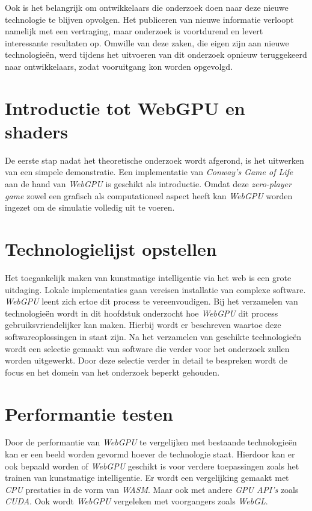 \bigbreak{}

Ook is het belangrijk om ontwikkelaars die onderzoek doen naar deze nieuwe technologie te blijven opvolgen. Het publiceren van nieuwe informatie verloopt namelijk met een vertraging, maar onderzoek is voortdurend en levert interessante resultaten op. Omwille van deze zaken, die eigen zijn aan nieuwe technologieën, werd tijdens het uitvoeren van dit onderzoek opnieuw teruggekeerd naar ontwikkelaars, zodat vooruitgang kon worden opgevolgd.

\section{Introductie tot WebGPU en shaders}

De eerste stap nadat het theoretische onderzoek wordt afgerond, is het uitwerken van een simpele demonstratie. Een implementatie van \textit{Conway's Game of Life} aan de hand van \textit{WebGPU} is geschikt als introductie. Omdat deze 
\textit{zero-player game} zowel een grafisch als computationeel aspect heeft kan \textit{WebGPU} worden ingezet om de simulatie volledig uit te voeren.

\section{Technologielijst opstellen}

Het toegankelijk maken van kunstmatige intelligentie via het web is een grote uitdaging. Lokale implementaties gaan vereisen installatie van complexe software. \textit{WebGPU} leent zich ertoe dit process te vereenvoudigen. Bij het verzamelen van technologieën wordt in dit hoofdstuk onderzocht hoe \textit{WebGPU} dit process ge\-bruiks\-vrien\-de\-lij\-ker kan maken. Hierbij wordt er beschreven waartoe deze softwareoplossingen in staat zijn. Na het verzamelen van geschikte technologieën wordt een selectie gemaakt van software die verder voor het onderzoek zullen worden uitgewerkt. Door deze selectie verder in detail te bespreken wordt de focus en het domein van het onderzoek beperkt gehouden.

\section{Performantie testen}

Door de performantie van \textit{WebGPU} te vergelijken met bestaande technologieën kan er een beeld worden gevormd hoever de technologie staat. Hierdoor kan er ook bepaald worden of \textit{WebGPU} geschikt is voor verdere toepassingen zoals het trainen van kunstmatige intelligentie. Er wordt een vergelijking gemaakt met \textit{CPU} prestaties in de vorm van \textit{WASM}. Maar ook met andere \textit{GPU API's} zoals \textit{CUDA}. Ook wordt \textit{WebGPU} vergeleken met voorgangers zoals \textit{WebGL}.

